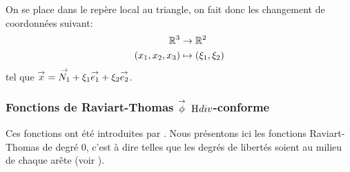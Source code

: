    \newcommand{\ncouche}{6}
    \newcommand{\setnodes}[6]{
        \renewcommand{\xa}{#1}
        \renewcommand{\ya}{#2}
        \renewcommand{\xb}{#3}
        \renewcommand{\yb}{#4}
        \renewcommand{\xc}{#5}
        \renewcommand{\yc}{#6}
    }
    \newcommand{\xa}{0.0}
    \newcommand{\ya}{0.0}
    \newcommand{\xb}{3.0}
    \newcommand{\yb}{0.0}
    \newcommand{\xc}{0.0}
    \newcommand{\yc}{3.0}
    \begin{minipage}{0.45\textwidth}
      \begin{center}
        \begin{tikzpicture}[scale=1]
          
        \end{tikzpicture}
      \end{center}
      \label{fig:form_int:fon_base:tri}
    \end{minipage}
    \begin{minipage}{0.54\textwidth}
     On se place dans le repère local au triangle, on fait donc les changement de coordonnées suivant:
    \begin{align*}
      \RR^3 &\rightarrow \RR^2 \\
      (x_1,x_2,x_3) & \mapsto (\xi_1,\xi_2)
    \end{align*}
      tel que \(\vx =\vect{N_1}+ \xi_1 \vect{e_1} + \xi_2 \vect{e_2}\).
    \end{minipage}

    \subsubsection[Fonctions de Raviart-Thomas phi Hdiv-conforme]{Fonctions de Raviart-Thomas \(\vect{\phi}\) \(\Hdiv\)-conforme}

      Ces fonctions ont été introduites par \cite{raviart_mixed_1977}. Nous présentons ici les fonctions Raviart-Thomas de degré 0, c'est à dire telles que les degrés de libertés soient au milieu de chaque arête (voir \cite[eq.~(3.10)]{raviart_mixed_1977}).

